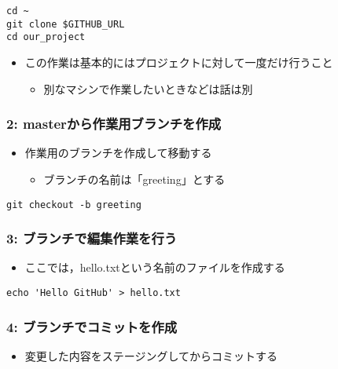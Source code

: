 \documentclass[a4paper,twoside,twocolumn]{bxjsarticle}
\begin{document}
\begin{verbatim}
cd ~
git clone $GITHUB_URL
cd our_project
\end{verbatim}

\begin{itemize}
\item この作業は基本的にはプロジェクトに対して一度だけ行うこと
\begin{itemize}
\item 別なマシンで作業したいときなどは話は別
\end{itemize}
\end{itemize}

\subsubsection{2: masterから作業用ブランチを作成}
\label{sec-2-3-3}
\begin{itemize}
\item 作業用のブランチを作成して移動する
\begin{itemize}
\item ブランチの名前は「greeting」とする
\end{itemize}
\end{itemize}

\begin{verbatim}
git checkout -b greeting
\end{verbatim}

\subsubsection{3: ブランチで編集作業を行う}
\label{sec-2-3-4}
\begin{itemize}
\item ここでは，hello.txtという名前のファイルを作成する
\end{itemize}

\begin{verbatim}
echo 'Hello GitHub' > hello.txt
\end{verbatim}

\subsubsection{4: ブランチでコミットを作成}
\label{sec-2-3-5}
\begin{itemize}
\item 変更した内容をステージングしてからコミットする
\end{itemize}
\end{document}
